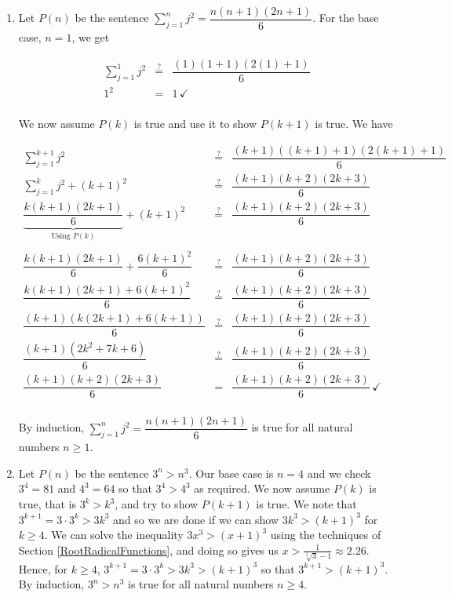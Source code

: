 \documentclass{ximera}
\begin{document}
\begin{enumerate}

\item  Let $P(n)$ be the sentence $\displaystyle{ \sum_{j=1}^{n} j^2 = \dfrac{n(n+1)(2n+1)}{6}}$. For the base case, $n=1$, we get

\[ \begin{array}{rcl} 

\displaystyle{ \sum_{j=1}^{1} j^2} & \stackrel{?}{=} &  \dfrac{(1)(1+1)(2(1)+1)}{6} \\ [15pt]
 1^2  & = & 1 \, \checkmark \\ \end{array} \]


We now assume $P(k)$ is true and use it to show $P(k+1)$ is true.  We have


\[ \begin{array}{rcl} 

\displaystyle{ \sum_{j=1}^{k+1} j^2} & \stackrel{?}{=} &  \dfrac{(k+1)((k+1)+1)(2(k+1)+1)}{6} \\ [15pt]
\displaystyle{ \sum_{j=1}^{k} j^2}  + (k+1)^2 &  \stackrel{?}{=}  & \dfrac{(k+1)(k+2)(2k+3)}{6} \\ [15pt]
\underbrace{\dfrac{k(k+1)(2k+1)}{6}}_{\text{Using $P(k)$}} + (k+1)^2 &  \stackrel{?}{=}  & \dfrac{(k+1)(k+2)(2k+3)}{6}  \\ 

&& \\

\dfrac{k(k+1)(2k+1)}{6} + \dfrac{6(k+1)^2}{6} &  \stackrel{?}{=}  & \dfrac{(k+1)(k+2)(2k+3)}{6}  \\ [10pt]
\dfrac{k(k+1)(2k+1)+6(k+1)^2}{6} &  \stackrel{?}{=}  & \dfrac{(k+1)(k+2)(2k+3)}{6}  \\ [10pt]
\dfrac{(k+1)(k(2k+1)+6(k+1))}{6} &  \stackrel{?}{=}  & \dfrac{(k+1)(k+2)(2k+3)}{6}  \\ [10pt]
\dfrac{(k+1)\left(2k^2+7k+6\right)}{6} &  \stackrel{?}{=}  & \dfrac{(k+1)(k+2)(2k+3)}{6}  \\ [10pt]
\dfrac{(k+1)(k+2)(2k+3)}{6} & = & \dfrac{(k+1)(k+2)(2k+3)}{6}  \, \checkmark \\ [10pt]
 \end{array} \]
 
 By induction, $\displaystyle{ \sum_{j=1}^{n} j^2 = \dfrac{n(n+1)(2n+1)}{6}}$ is true for all natural numbers $n \geq 1$.

\addtocounter{enumi}{2}

\item Let $P(n)$  be the sentence $3^n > n^3$.  Our base case is $n=4$ and we check $3^4 = 81$ and $4^3 = 64$ so that $3^4 > 4^3$ as required.  We now assume $P(k)$ is true, that is $3^k > k^3$, and try to show $P(k+1)$ is true.  We note that $3^{k+1} = 3 \cdot 3^{k} > 3k^3$ and so we are done if we can show $3k^3 > (k+1)^3$ for $k \geq 4$. We can solve the inequality $3x^3 > (x+1)^3$ using the techniques of Section \ref{RootRadicalFunctions}, and doing so gives us $x > \frac{1}{\sqrt[3]{3}-1} \approx 2.26.$  Hence, for $k \geq 4$, $3^{k+1} = 3 \cdot 3^{k} > 3k^3 > (k+1)^3$ so that $3^{k+1} > (k+1)^3$.   By induction, $3^n > n^3$ is true for all natural numbers $n \geq 4$.


\end{enumerate}
\end{document}
